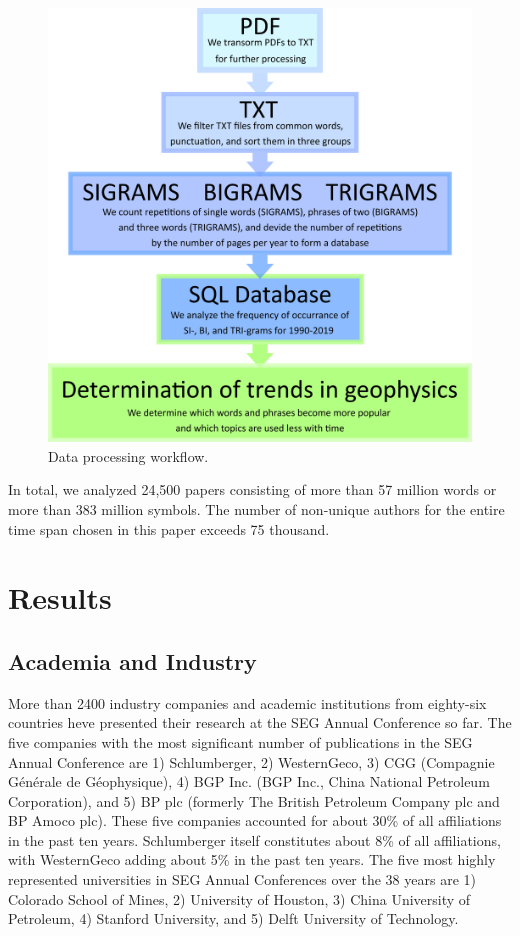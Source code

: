 \documentclass[geosciences,article,submit,moreauthors,pdftex]{Definitions/mdpi}
\begin{document}
\begin{figure}[ht!]
\centering
\includegraphics[scale=1]{scheme.png}
\caption{Data processing workflow.}
\label{scheme_workflow}
\end{figure}


In total, we analyzed 24,500 papers consisting of more than 57 million words or more than 383 million symbols. The number of non-unique authors for the entire time span chosen in this paper exceeds 75 thousand.

 
\section{Results}
\subsection{Academia and Industry}

More than 2400 industry companies and academic institutions from eighty-six countries heve presented their research at the SEG Annual Conference so far. The five companies with the most significant number of publications in the SEG Annual Conference are 1) Schlumberger, 2) WesternGeco, 3) CGG (Compagnie Générale de Géophysique), 4) BGP Inc. (BGP Inc., China National Petroleum Corporation), and 5) BP plc (formerly The British Petroleum Company plc and BP Amoco plc). These five companies accounted for about 30\% of all affiliations in the past ten years. Schlumberger itself constitutes about 8\% of all affiliations, with WesternGeco adding about 5\% in the past ten years. The five most highly represented universities in SEG Annual Conferences over the 38 years are 1) Colorado School of Mines, 2) University of Houston, 3) China University of Petroleum, 4) Stanford University, and 5) Delft University of Technology. 
 
\end{document}
